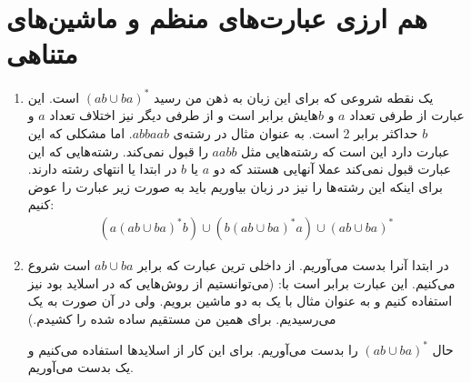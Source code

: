 \section{هم ارزی عبارت‌های منظم و ماشین‌های متناهی}
\begin{enumerate}
    \item یک نقطه شروعی که برای این زبان به ذهن من رسید
    $(ab \cup ba)^*$
    است. این عبارت از طرفی تعداد
    $a$ و $b$هایش
    برابر است و از طرفی دیگر نیز اختلاف تعداد
    $a$ و $b$
    حداکثر برابر 2 است. به عنوان مثال در رشته‌ی
    $abbaab$.
    اما مشکلی که این عبارت دارد این است که رشته‌هایی مثل
    $aabb$
    را قبول نمی‌کند.
    رشته‌هایی که این عبارت قبول نمی‌کند عملا آنهایی هستند که دو
    $a$ یا $b$
    در ابتدا یا انتهای رشته دارند. برای اینکه این رشته‌ها را نیز در زبان بیاوریم باید به صورت زیر عبارت را
    عوض کنیم:
    \begin{gather*}
        \left(a(ab \cup ba)^*b\right) \cup \left(b(ab \cup ba)^*a\right) \cup \left(ab \cup ba\right)^*
    \end{gather*}
    \item در ابتدا
    آنرا بدست می‌آوریم. از داخلی ترین عبارت که برابر
    $ab \cup ba$
    است شروع می‌کنیم.  این عبارت برابر است با:
    (می‌توانستیم از روش‌هایی که در اسلاید بود نیز استفاده کنیم و به عنوان مثال با یک
    به دو ماشین برویم. ولی در آن صورت به یک
    می‌رسیدیم. برای همین من مستقیم
    ساده شده را کشیدم.)
    \begin{latin}
        \centering
    \end{latin}
    حال
    $(ab \cup ba)^*$
    را بدست می‌آوریم. برای این کار از اسلاید‌ها استفاده می‌کنیم و یک
    بدست می‌آوریم.
    \begin{latin}
        \centering
        \begin{tikzpicture}[->, >=stealth', auto, semithick, node distance=2cm]

\end{tikzpicture}
\end{latin}
\end{enumerate}
